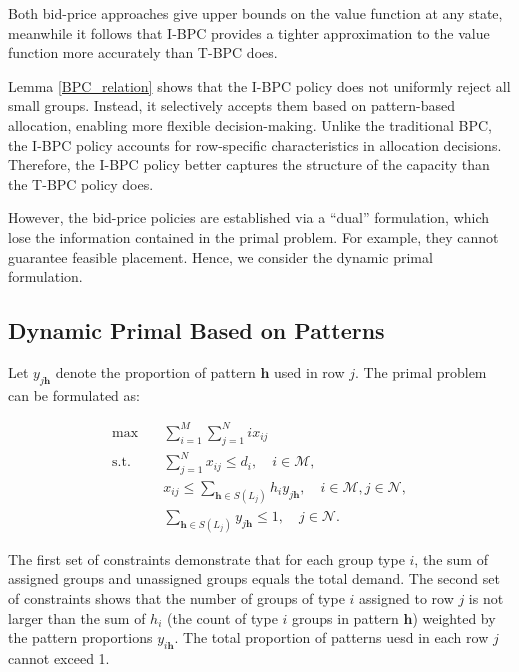     
    
Both bid-price approaches give upper bounds on the value function at any state, meanwhile it follows that I-BPC provides a tighter approximation to the value function more accurately than T-BPC does.    

Lemma \ref{BPC_relation} shows that the I-BPC policy does not uniformly reject all small groups. Instead, it selectively accepts them based on pattern-based allocation, enabling more flexible decision-making. Unlike the traditional BPC, the I-BPC policy accounts for row-specific characteristics in allocation decisions. Therefore, the I-BPC policy better captures the structure of the capacity than the T-BPC policy does.

However, the bid-price policies are established via a ``dual'' formulation, which lose the information contained in the primal problem. For example, they cannot guarantee feasible placement. Hence, we consider the dynamic primal formulation.

\subsection{Dynamic Primal Based on Patterns}

Let $y_{j \bm{h}}$ denote the proportion of pattern $\bm{h}$ used in row $j$. The primal problem can be formulated as:

\begin{equation}\label{improve_primal}
    \begin{aligned}
    \max \quad & \sum_{i=1}^M \sum_{j=1}^N i x_{i j} \\
    \text {s.t.} \quad & \sum_{j=1}^N x_{i j} \leq d_i, \quad i \in \mathcal{M}, \\
    & x_{i j} \leq \sum_{\bm{h} \in S(L_{j})} h_i y_{j \bm{h}}, \quad i \in \mathcal{M}, j \in \mathcal{N}, \\
    & \sum_{\bm{h} \in S(L_{j})} y_{j \bm{h}} \leq 1, \quad j \in \mathcal{N}.
    \end{aligned}
\end{equation}

The first set of constraints demonstrate that for each group type $i$, the sum of assigned groups and unassigned groups equals the total demand. The second set of constraints shows that the number of groups of type $i$ assigned to row $j$ is not larger than the sum of $h_{i}$ (the count of type $i$ groups in pattern $\bm{h}$) weighted by the pattern proportions $y_{i \bm{h}}$. The total proportion of patterns uesd in each row $j$ cannot exceed 1.


